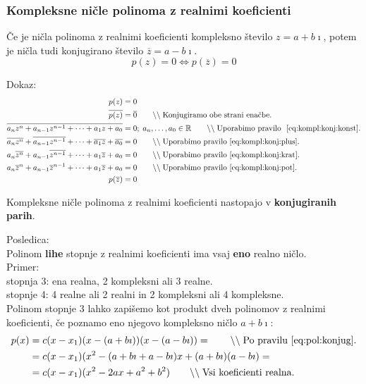\documentclass[a4paper,oneside,12pt,fleqn]{article}
\def\R{\ensuremath{\mathbb R}}
\newcommand{\comment}[1]{\ensuremath{\qquad\backslash\backslash\;}\textnormal{#1}}
\newcommand{\ii}{\ensuremath{\imath}}
\def\konj{\overline} %
\renewcommand\iff\Leftrightarrow
\numberwithin{equation}{section}
\begin{document}
\subsubsection{Kompleksne ničle polinoma z realnimi koeficienti}
\label{sec:pol:nic:kompl}
Če je ničla polinoma z realnimi koeficienti kompleksno število $z=a+b\ii$, potem je ničla
tudi konjugirano število $\konj{z} = a-b\ii$.
\begin{equation}
  p(z) = 0 \iff p(\konj{z}) = 0 \label{eq:pol:konjug}
\end{equation}

Dokaz:
\begin{align*}
  p(z) &= 0 \\
  \konj{p(z)} &= \konj{0} \comment{Konjugiramo obe strani enačbe.} \\
  \konj{a_nz^n+a_{n-1}z^{n-1}+\cdots+a_1z+a_0} &= 0; \; a_n,\ldots,a_0 \in \R \comment{Uporabimo pravilo~
  \eqref{eq:kompl:konj:konst}.} \\
  \konj{a_nz^n}+\konj{a_{n-1}z^{n-1}}+\cdots+\konj{a_1z}+\konj{a_0} &= 0
  \comment{Uporabimo pravilo~\eqref{eq:kompl:konj:plus}.} \\
  a_n\konj{z^n}+a_{n-1}\konj{z^{n-1}}+\cdots+a_1\konj{z}+a_0 &= 0 \comment{Uporabimo
  pravilo~\eqref{eq:kompl:konj:krat}.} \\
  a_n\konj{z}^n+a_{n-1}\konj{z}^{n-1}+\cdots+a_1\konj{z}+a_0 &= 0 \comment{Uporabimo
  pravilo~\eqref{eq:kompl:konj:pot}.}\\
  p(\konj{z}) &= 0
\end{align*}

Kompleksne ničle polinoma z realnimi koeficienti nastopajo v \textbf{konjugiranih parih}.

Posledica: \\
Polinom \textbf{lihe} stopnje z realnimi koeficienti ima vsaj \textbf{eno} realno ničlo. \\
Primer: \\
stopnja 3: ena realna, 2 kompleksni ali 3 realne. \\
stopnje 4: 4 realne ali 2 realni in 2 kompleksni ali 4 kompleksne. \\

Polinom stopnje 3 lahko zapišemo kot produkt dveh polinomov z realnimi koeficienti, če
poznamo eno njegovo kompleksno ničlo $a+b\ii$:
\begin{align*}
  p(x) &= c(x-x_1)(x-(a+b\ii))(x-(a-b\ii)) = \comment{Po pravilu \eqref{eq:pol:konjug}.} \\
  &= c(x-x_1)(x^2 -(a+b\ii+a-b\ii)x + (a+b\ii)(a-b\ii) = \\
  &= c(x-x_1)(x^2 -2ax + a^2+b^2) \comment{Vsi koeficienti realna.}
\end{align*}
\end{document}
